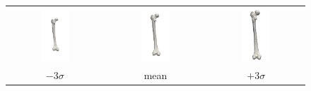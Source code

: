 \documentclass{InsightArticle}
\begin{document}
\begin{figure}[t]
  \begin{tabular}{ccc}
    \includegraphics[width=0.3\textwidth]{pictures/femur-pc1m1.png}&
    \includegraphics[width=0.3\textwidth]{pictures/femur-mean.png}& 
    \includegraphics[width=0.3\textwidth]{pictures/femur-pc1p1.png}
    \\
    $-3 \sigma$ & mean & $+3 \sigma$
  \end{tabular}
    \label{fig:vispca}
\end{figure}
\end{document}
